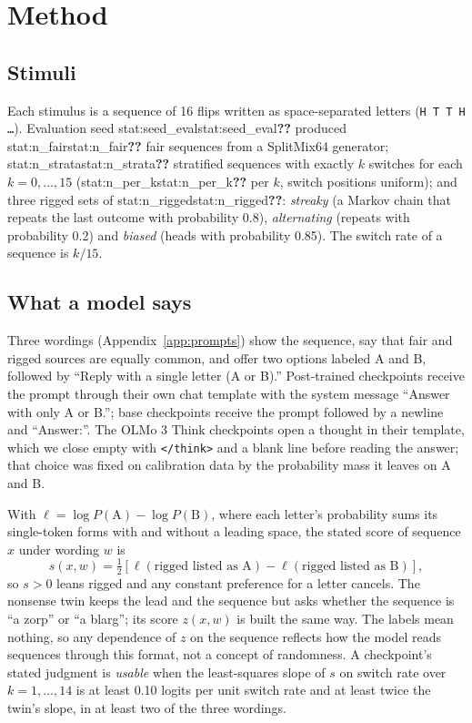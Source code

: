 \documentclass[11pt]{article}
\newcommand{\stat}[1]{\ifcsname stat:#1\endcsname\csname stat:#1\endcsname\else\textbf{??}\fi}
\begin{document}
\section{Method}

\subsection{Stimuli}
Each stimulus is a sequence of 16 flips written as space-separated letters (\texttt{H T T H \ldots}). Evaluation seed \stat{seed_eval} produced \stat{n_fair} fair sequences from a SplitMix64 generator; \stat{n_strata} stratified sequences with exactly $k$ switches for each $k = 0, \ldots, 15$ (\stat{n_per_k} per $k$, switch positions uniform); and three rigged sets of \stat{n_rigged}: \emph{streaky} (a Markov chain that repeats the last outcome with probability 0.8), \emph{alternating} (repeats with probability 0.2) and \emph{biased} (heads with probability 0.85). The switch rate of a sequence is $k/15$.

\subsection{What a model says}
Three wordings (Appendix~\ref{app:prompts}) show the sequence, say that fair and rigged sources are equally common, and offer two options labeled A and B, followed by ``Reply with a single letter (A or B).'' Post-trained checkpoints receive the prompt through their own chat template with the system message ``Answer with only A or B.''; base checkpoints receive the prompt followed by a newline and ``Answer:''. The OLMo 3 Think checkpoints open a thought in their template, which we close empty with \texttt{</think>} and a blank line before reading the answer; that choice was fixed on calibration data by the probability mass it leaves on A and B.

With $\ell = \log P(\mathrm{A}) - \log P(\mathrm{B})$, where each letter's probability sums its single-token forms with and without a leading space, the stated score of sequence $x$ under wording $w$ is
\[
s(x, w) = \tfrac12 \left[ \ell(\text{rigged listed as A}) - \ell(\text{rigged listed as B}) \right],
\]
so $s > 0$ leans rigged and any constant preference for a letter cancels. The nonsense twin keeps the lead and the sequence but asks whether the sequence is ``a zorp'' or ``a blarg''; its score $z(x, w)$ is built the same way. The labels mean nothing, so any dependence of $z$ on the sequence reflects how the model reads sequences through this format, not a concept of randomness. A checkpoint's stated judgment is \emph{usable} when the least-squares slope of $s$ on switch rate over $k = 1, \ldots, 14$ is at least 0.10 logits per unit switch rate and at least twice the twin's slope, in at least two of the three wordings.
\end{document}
